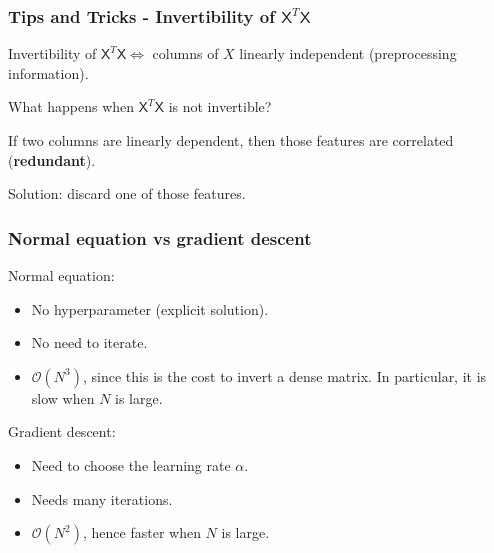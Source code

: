 \documentclass{beamer}
\begin{document}
	\begin{frame}
		\frametitle{Tips and Tricks - Invertibility of $\mathsf{X}^T\mathsf{X}$}
		
		Invertibility of $\mathsf{X}^T\mathsf{X} \iff$ columns of $X$ linearly independent (preprocessing information).
		
		\vspace{5mm}
		
		What happens when $\mathsf{X}^T\mathsf{X}$ is not invertible?
		
		\vspace{5mm}
		
		If two columns are linearly dependent, then those features are correlated (\textbf{redundant}).
		
		\vspace{5mm}
		
		Solution: discard one of those features.
	\end{frame}

	\begin{frame}
		\frametitle{Normal equation vs gradient descent}
		Normal equation:
		\begin{itemize}
			\item No hyperparameter (explicit solution).
			\item No need to iterate.
			\item $\mathcal{O}(N^3)$, since this is the cost to invert a dense matrix. In particular, it is slow when $N$ is large.
		\end{itemize}
	
		\vspace{5mm}
	
		Gradient descent:
		\begin{itemize}
			\item Need to choose the learning rate $\alpha$.
			\item Needs many iterations.
			\item $\mathcal{O}(N^2)$, hence faster when $N$ is large.
		\end{itemize}
	\end{frame}
\end{document}
